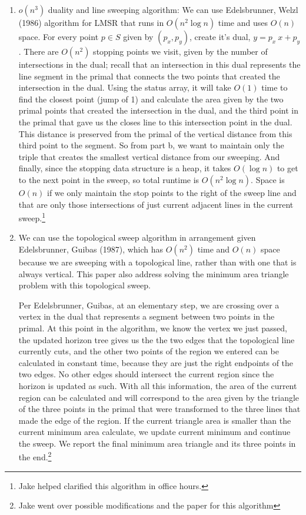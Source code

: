\documentclass [12pt]{article}
\begin{document}
\begin{enumerate}[label=\alph*.]
        \pagebreak

        \item $o(n^3)$ duality and line sweeping algorithm: We can use Edelsbrunner, Welzl (1986) algorithm for LMSR that runs in $O(n^2 \log n)$ time and uses $O(n)$ space. For every point $p\in S$ given by $(p_x, p_y)$, create it's dual, $y = p_x\ x + p_y$. There are $O(n^2)$ stopping points we visit, given by the number of intersections in the dual; recall that an intersection in this dual represents the line segment in the primal that connects the two points that created the intersection in the dual. Using the status array, it will take $O(1)$ time to find the closest point (jump of 1) and calculate the area given by the two primal points that created the intersection in the dual, and the third point in the primal that gave us the closes line to this intersection point in the dual. This distance is preserved from the primal of the vertical distance from this third point to the segment. So from part b, we want to maintain only the triple that creates the smallest vertical distance from our sweeping. And finally, since the stopping data structure is a heap, it takes $O(\log n)$ to get to the next point in the sweep, so total runtime is $O(n^2 \log n)$. Space is $O(n)$ if we only maintain the stop points to the right of the sweep line and that are only those intersections of just current adjacent lines in the current sweep.\footnote{Jake helped clarified this algorithm in office hours.}
        

        \item We can use the topological sweep algorithm in arrangement given Edelsbrunner, Guibas (1987), which has $O(n^2)$ time and $O(n)$ space because we are sweeping with a topological line, rather than with one that is always vertical. This paper also address solving the minimum area triangle problem with this topological sweep.
        
        Per Edelsbrunner, Guibas, at an elementary step, we are crossing over a vertex in the dual that represents a segment between two points in the primal. At this point in the algorithm, we know the vertex we just passed, the updated horizon tree gives us the the two edges that the topological line currently cuts, and the other two points of the region we entered can be calculated in constant time, because they are just the right endpoints of the two edges. No other edges should intersect the current region since the horizon is updated as such. With all this information, the area of the current region can be calculated and will correspond to the area given by the triangle of the three points in the primal that were transformed to the three lines that made the edge of the region. If the current triangle area is smaller than the current minimum area calculate, we update current minimum and continue the sweep. We report the final minimum area triangle and its three points in the end.\footnote{Jake went over possible modifications and the paper for this algorithm} 
       
    \end{enumerate}
\end{document}
